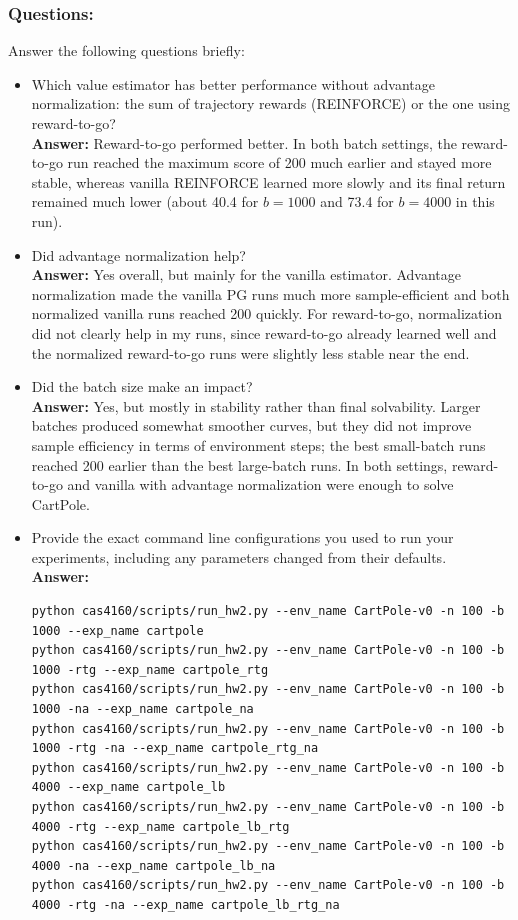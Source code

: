 \documentclass{article}
\begin{document}
\subsubsection{Questions:}

Answer the following questions briefly:
\begin{itemize}
    \item Which value estimator has better performance without advantage normalization: the sum of trajectory rewards (REINFORCE) or the one using reward-to-go? \\
    \textbf{Answer:} Reward-to-go performed better. In both batch settings, the reward-to-go run reached the maximum score of 200 much earlier and stayed more stable, whereas vanilla REINFORCE learned more slowly and its final return remained much lower (about 40.4 for $b=1000$ and 73.4 for $b=4000$ in this run).
    \item Did advantage normalization help? \\
    \textbf{Answer:} Yes overall, but mainly for the vanilla estimator. Advantage normalization made the vanilla PG runs much more sample-efficient and both normalized vanilla runs reached 200 quickly. For reward-to-go, normalization did not clearly help in my runs, since reward-to-go already learned well and the normalized reward-to-go runs were slightly less stable near the end.
    \item Did the batch size make an impact? \\
    \textbf{Answer:} Yes, but mostly in stability rather than final solvability. Larger batches produced somewhat smoother curves, but they did not improve sample efficiency in terms of environment steps; the best small-batch runs reached 200 earlier than the best large-batch runs. In both settings, reward-to-go and vanilla with advantage normalization were enough to solve CartPole.
    \item Provide the exact command line configurations you used to run your experiments, including any parameters changed from their defaults. \\
    \textbf{Answer:}
\begin{verbatim}
python cas4160/scripts/run_hw2.py --env_name CartPole-v0 -n 100 -b 1000 --exp_name cartpole
python cas4160/scripts/run_hw2.py --env_name CartPole-v0 -n 100 -b 1000 -rtg --exp_name cartpole_rtg
python cas4160/scripts/run_hw2.py --env_name CartPole-v0 -n 100 -b 1000 -na --exp_name cartpole_na
python cas4160/scripts/run_hw2.py --env_name CartPole-v0 -n 100 -b 1000 -rtg -na --exp_name cartpole_rtg_na
python cas4160/scripts/run_hw2.py --env_name CartPole-v0 -n 100 -b 4000 --exp_name cartpole_lb
python cas4160/scripts/run_hw2.py --env_name CartPole-v0 -n 100 -b 4000 -rtg --exp_name cartpole_lb_rtg
python cas4160/scripts/run_hw2.py --env_name CartPole-v0 -n 100 -b 4000 -na --exp_name cartpole_lb_na
python cas4160/scripts/run_hw2.py --env_name CartPole-v0 -n 100 -b 4000 -rtg -na --exp_name cartpole_lb_rtg_na
\end{verbatim}
\end{itemize}
\end{document}
